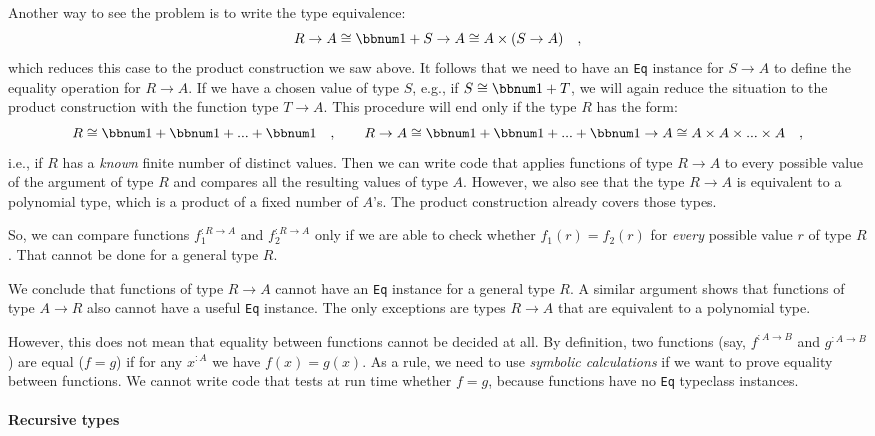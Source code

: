 Another way to see the problem is to write the type equivalence:
\[
R\rightarrow A\cong\bbnum 1+S\rightarrow A\cong A\times(S\rightarrow A)\quad,
\]
which reduces this case to the product construction we saw above.
It follows that we need to have an \lstinline!Eq! instance for $S\rightarrow A$
to define the equality operation for $R\rightarrow A$. If we have
a chosen value of type $S$, e.g., if $S\cong\bbnum 1+T$, we will
again reduce the situation to the product construction with the function
type $T\rightarrow A$. This procedure will end only if the type $R$
has the form:
\[
R\cong\bbnum 1+\bbnum 1+...+\bbnum 1\quad,\quad\quad R\rightarrow A\cong\bbnum 1+\bbnum 1+...+\bbnum 1\rightarrow A\cong A\times A\times...\times A\quad,
\]
i.e., if $R$ has a \emph{known} finite number of distinct values.
Then we can write code that applies functions of type $R\rightarrow A$
to every possible value of the argument of type $R$ and compares
all the resulting values of type $A$. However, we also see that the
type $R\rightarrow A$ is equivalent to a polynomial type, which is
a product of a fixed number of $A$\textsf{'}s. The product construction already
covers those types.

So, we can compare functions $f_{1}^{:R\rightarrow A}$ and $f_{2}^{:R\rightarrow A}$
only if we are able to check whether $f_{1}(r)=f_{2}(r)$ for \emph{every}
possible value $r$ of type $R$. That cannot be done for a general
type $R$.

We conclude that functions of type $R\rightarrow A$ cannot have an
\lstinline!Eq! instance for a general type $R$. A similar argument
shows that functions of type $A\rightarrow R$ also cannot have a
useful \lstinline!Eq! instance. The only exceptions are types $R\rightarrow A$
that are equivalent to a polynomial type.

However, this does not mean that equality between functions cannot
be decided at all. By definition,
two functions (say, $f^{:A\rightarrow B}$ and $g^{:A\rightarrow B}$)
are equal ($f=g$) if for any $x^{:A}$ we have $f(x)=g(x)$. As a
rule, we need to use \emph{symbolic
calculations} if we want to prove equality between functions. We cannot
write code that tests at run time whether $f=g$, because functions
have no \lstinline!Eq! typeclass instances.

\paragraph{Recursive types}

